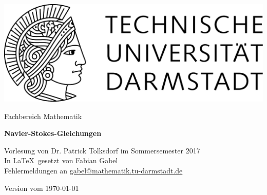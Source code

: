 \documentclass[11pt,a4paper,leqno]{report}
\begin{document}
\hypersetup{pageanchor=false}
\begin{titlepage}
  \begin{center}
    \vspace{1cm}
    \includegraphics[width=0.5\linewidth]{TU_Darmstadt_Logo.pdf}
    \vspace{1cm}
    
    \large{Fachbereich Mathematik}
    \vspace{3.5cm}
    
    \Huge{\textbf{Navier-Stokes-Gleichungen}}
    
    \vspace*{1cm}    
    \large{Vorlesung von Dr. Patrick Tolksdorf im Sommersemester 2017\\}
    \vspace*{1.0cm}
    \small{In \LaTeX\ gesetzt von Fabian Gabel\\}
    \small{Fehlermeldungen an \url{gabel@mathematik.tu-darmstadt.de}}

    \vspace*{\fill}
    \small{Version vom \today}
  \end{center}
\end{titlepage}

\hypersetup{pageanchor=true}
\tableofcontents








\end{document}
